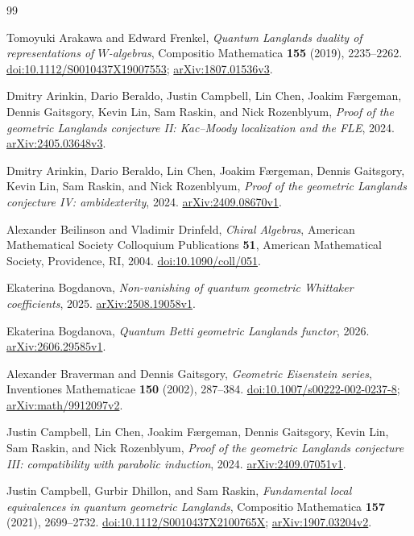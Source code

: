 \documentclass[11pt]{article}
\numberwithin{equation}{section}
\theoremstyle{definition}
\theoremstyle{remark}
\begin{document}
\begin{thebibliography}{99}
\raggedright

Tomoyuki Arakawa and Edward Frenkel,
\emph{Quantum Langlands duality of representations of $W$-algebras},
Compositio Mathematica \textbf{155} (2019), 2235--2262.
\href{https://doi.org/10.1112/S0010437X19007553}{doi:10.1112/S0010437X19007553};
\href{https://arxiv.org/abs/1807.01536v3}{arXiv:1807.01536v3}.

Dmitry Arinkin, Dario Beraldo, Justin Campbell, Lin Chen, Joakim F\ae rgeman,
Dennis Gaitsgory, Kevin Lin, Sam Raskin, and Nick Rozenblyum,
\emph{Proof of the geometric Langlands conjecture II: Kac--Moody localization
and the FLE}, 2024.
\href{https://arxiv.org/abs/2405.03648v3}{arXiv:2405.03648v3}.

Dmitry Arinkin, Dario Beraldo, Lin Chen, Joakim F\ae rgeman,
Dennis Gaitsgory, Kevin Lin, Sam Raskin, and Nick Rozenblyum,
\emph{Proof of the geometric Langlands conjecture IV: ambidexterity}, 2024.
\href{https://arxiv.org/abs/2409.08670v1}{arXiv:2409.08670v1}.

Alexander Beilinson and Vladimir Drinfeld,
\emph{Chiral Algebras}, American Mathematical Society Colloquium
Publications \textbf{51}, American Mathematical Society, Providence, RI, 2004.
\href{https://doi.org/10.1090/coll/051}{doi:10.1090/coll/051}.

Ekaterina Bogdanova,
\emph{Non-vanishing of quantum geometric Whittaker coefficients}, 2025.
\href{https://arxiv.org/abs/2508.19058v1}{arXiv:2508.19058v1}.

Ekaterina Bogdanova,
\emph{Quantum Betti geometric Langlands functor}, 2026.
\href{https://arxiv.org/abs/2606.29585v1}{arXiv:2606.29585v1}.

Alexander Braverman and Dennis Gaitsgory,
\emph{Geometric Eisenstein series},
Inventiones Mathematicae \textbf{150} (2002), 287--384.
\href{https://doi.org/10.1007/s00222-002-0237-8}{doi:10.1007/s00222-002-0237-8};
\href{https://arxiv.org/abs/math/9912097v2}{arXiv:math/9912097v2}.

Justin Campbell, Lin Chen, Joakim F\ae rgeman, Dennis Gaitsgory,
Kevin Lin, Sam Raskin, and Nick Rozenblyum,
\emph{Proof of the geometric Langlands conjecture III: compatibility with
parabolic induction}, 2024.
\href{https://arxiv.org/abs/2409.07051v1}{arXiv:2409.07051v1}.

Justin Campbell, Gurbir Dhillon, and Sam Raskin,
\emph{Fundamental local equivalences in quantum geometric Langlands},
Compositio Mathematica \textbf{157} (2021), 2699--2732.
\href{https://doi.org/10.1112/S0010437X2100765X}{doi:10.1112/S0010437X2100765X};
\href{https://arxiv.org/abs/1907.03204v2}{arXiv:1907.03204v2}.


\end{thebibliography}
\end{document}
